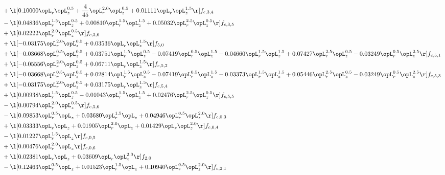 \begin{alignat}{2}
& + \l[  0.10000 \opL_r \opL_z^{0.5} + \frac{4}{45} \opL_r^{2.0} \opL_z^{0.5} +  0.01111 \opL_r \opL_z^{1.5}  \r] f_{c,3,4} \nonumber \\ 
& - \l[  0.04836 \opL_r^{1.5} \opL_z^{0.5} +  0.00810 \opL_r^{1.5} \opL_z^{1.5} +  0.05032 \opL_r^{2.5} \opL_z^{0.5}  \r] f_{c,3,5} \nonumber \\ 
& + \l[  0.02222 \opL_r^{2.0} \opL_z^{0.5}  \r] f_{c,3,6} \nonumber \\ 
& + \l[  -0.03175 \opL_r^{2.0} \opL_z^{0.5} +  0.03536 \opL_r \opL_z^{1.5}  \r] f_{5,0} \nonumber \\ 
& + \l[  -0.03668 \opL_r^{0.5} \opL_z^{0.5} +  0.03751 \opL_r^{1.5} \opL_z^{0.5}   -0.07419 \opL_r^{0.5} \opL_z^{1.5}   -0.04660 \opL_r^{1.5} \opL_z^{1.5} +  0.07427 \opL_r^{2.5} \opL_z^{0.5}   -0.03249 \opL_r^{0.5} \opL_z^{2.5}  \r] f_{c,5,1} \nonumber \\ 
& + \l[  -0.05556 \opL_r^{2.0} \opL_z^{0.5} +  0.06711 \opL_r \opL_z^{1.5}  \r] f_{c,5,2} \nonumber \\ 
& + \l[  -0.03668 \opL_r^{0.5} \opL_z^{0.5} +  0.02814 \opL_r^{1.5} \opL_z^{0.5}   -0.07419 \opL_r^{0.5} \opL_z^{1.5}   -0.03373 \opL_r^{1.5} \opL_z^{1.5} +  0.05446 \opL_r^{2.5} \opL_z^{0.5}   -0.03249 \opL_r^{0.5} \opL_z^{2.5}  \r] f_{c,5,3} \nonumber \\ 
& + \l[  -0.03175 \opL_r^{2.0} \opL_z^{0.5} +  0.03175 \opL_r \opL_z^{1.5}  \r] f_{c,5,4} \nonumber \\ 
& + \l[  0.00938 \opL_r^{1.5} \opL_z^{0.5}   -0.01043 \opL_r^{1.5} \opL_z^{1.5} +  0.02476 \opL_r^{2.5} \opL_z^{0.5}  \r] f_{c,5,5} \nonumber \\ 
& - \l[  0.00794 \opL_r^{2.0} \opL_z^{0.5}  \r] f_{c,5,6} \nonumber \\ 
& - \l[  0.09853 \opL_r^{0.5} \opL_z +  0.03680 \opL_r^{1.5} \opL_z +  0.04946 \opL_r^{0.5} \opL_z^{2.0}  \r] f_{c,0,3} \nonumber \\ 
& + \l[  0.03333 \opL_r \opL_z +  0.01905 \opL_r^{2.0} \opL_z +  0.01429 \opL_r \opL_z^{2.0}  \r] f_{c,0,4} \nonumber \\ 
& - \l[  0.01227 \opL_r^{1.5} \opL_z  \r] f_{c,0,5} \nonumber \\ 
& + \l[  0.00476 \opL_r^{2.0} \opL_z  \r] f_{c,0,6} \nonumber \\ 
& + \l[  0.02381 \opL_r \opL_z +  0.03609 \opL_r \opL_z^{2.0}  \r] f_{2,0} \nonumber \\ 
& - \l[  0.12463 \opL_r^{0.5} \opL_z +  0.01523 \opL_r^{1.5} \opL_z +  0.10940 \opL_r^{0.5} \opL_z^{2.0}  \r] f_{c,2,1} \nonumber \\ 

\end{alignat}
